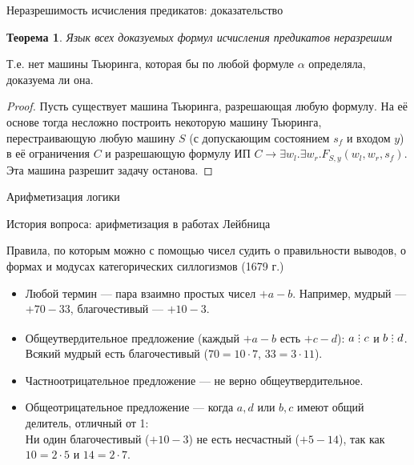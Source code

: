 \documentclass[aspectratio=169]{beamer}
\newtheorem{thm}{Теорема}[section]
\newcommand{\divisible}%
{\mathrel{\lower.2ex%
\vbox{\baselineskip=0.7ex\lineskiplimit=0pt%
\kern6pt \hbox{.}\hbox{.}\hbox{.}}%
}}
\begin{document}
\begin{frame}{Неразрешимость исчисления предикатов: доказательство}
\begin{thm}Язык всех доказуемых формул исчисления предикатов неразрешим\end{thm}
Т.е. нет машины Тьюринга, которая бы по любой формуле $\alpha$ определяла, доказуема ли она.\pause
\begin{proof} Пусть существует машина Тьюринга, разрешающая любую формулу. \pause%
На её основе тогда несложно построить некоторую машину Тьюринга, перестраивающую любую машину $S$ (с допускающим состоянием $s_f$ и входом $y$) 
в её ограничения $C$ и разрешающую формулу ИП $C \rightarrow \exists w_l.\exists w_r.F_{S,y}(w_l,w_r,s_f)$. 
Эта машина разрешит задачу останова.
\end{proof}
\end{frame}


\begin{frame}
\begin{center}\LARGE Арифметизация логики\end{center}
\end{frame}

\begin{frame}{История вопроса: арифметизация в работах Лейбница}
\begin{center}Правила, по которым можно с помощью чисел судить о правильности выводов, о формах и модусах категорических силлогизмов (1679 г.)\end{center}

\begin{itemize}
\item Любой термин --- пара взаимно простых чисел $+a-b$. Например, мудрый --- $+70-33$, благочестивый --- $+10-3$.

\item Общеутвердительное предложение (каждый $+a-b$ есть $+c-d$): $a \divisible c$ и $b \divisible d$.\\
Всякий мудрый есть благочестивый ($70 = 10\cdot 7$, $33 = 3 \cdot 11$).

\item Частноотрицательное предложение --- не верно общеутвердительное.

\item Общеотрицательное предложение --- когда $a,d$ или $b,c$ имеют общий делитель, отличный от 1:\\
Ни один благочестивый ($+10-3$) не есть несчастный ($+5-14$), так как $10=2 \cdot 5$ и $14 =2 \cdot 7$.
\end{itemize}
\end{frame}
\end{document}
